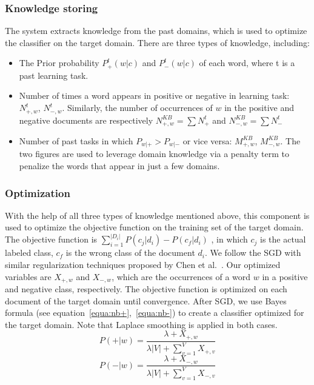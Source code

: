 \subsubsection{Knowledge storing}
The system extracts knowledge from the past domains, which is used to optimize the classifier on the target domain.
There are three types of knowledge, including:
\begin{itemize}
	\item
	The Prior probability $P^t_+(w|c)$ and $P^t_-(w|c)$ of each word, where t is a past learning task.
	\item
	Number of times a word appears in positive or negative in learning task: $N^t_{+,w}$, $N^t_{-,w}$.
	Similarly, the number of occurrences of $w$ in the positive and negative documents are respectively $N^{KB}_{+,w}= \sum{N^t_+}$ and $N^{KB}_{-,w} = \sum{N^t_-}$
	\item
	Number of past tasks in which $P_{w|+}>P_{w|-}$ or vice versa: $M^{KB}_{+,w}$, $M^{KB}_{-,w}$.
	The two figures are used to leverage domain knowledge via a penalty term to penalize the words that appear in just a few domains. %
\end{itemize}

\subsubsection{Optimization}
With the help of all three types of knowledge mentioned above, this component is used to optimize the objective function on the training set of the target domain. %
The objective function is $\sum_{i=1}^{|D_i|}{P(c_j|d_i)-P(c_f|d_i)} $ , in which $c_j$ is the actual labeled class, $c_f$ is the wrong class of the document $d_i$.
We follow the SGD with similar regularization techniques proposed by Chen et al.~\cite{chen-ma-liu:2015:ACL-IJCNLP}.
Our optimized variables are $X_{+,w}$ and $X_{-,w}$, which are the occurrences of a word $w$ in a positive and negative class, respectively. 
The objective function is optimized on each document of the target domain until convergence.
After SGD, we use Bayes formula (see equation~\ref{equa:nb+},~\ref{equa:nb-}) to create a classifier optimized for the target domain. 
Note that Laplace smoothing is applied in both cases.
\begin{equation}
P(+|w)= \frac{\lambda + X_{+,w}}{\lambda|V|+\sum_{v=1}^{V}{X_{+,v}}}
\label{equa:nb+}
\end{equation}
\begin{equation}
P(-|w)= \frac{\lambda + X_{-,w}}{\lambda|V|+\sum_{v=1}^{V}{X_{-,v}}}
\label{equa:nb-}
\end{equation}

